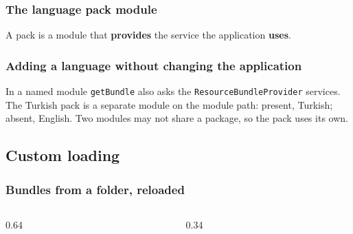 \documentclass[aspectratio=169,10pt,compress]{beamer}
\begin{document}
\begin{frame}[t,fragile] \frametitle{The language pack module}
  \small A pack is a module that \textbf{provides} the service the application \textbf{uses}.
\end{frame}




\begin{frame}[t,fragile] \frametitle{Adding a language without changing the application}

  \vspace{0.1em}
  \small
  In a named module \texttt{getBundle} also asks the \texttt{ResourceBundleProvider} services. The Turkish pack is a separate
  module on the module path: present, Turkish; absent, English. Two modules may not share a package, so the pack uses its own.
\end{frame}

\subsection[Custom loading]{Custom loading}




\begin{frame}[t,fragile] \frametitle{Bundles from a folder, reloaded}
  \begin{columns}[T]
    \begin{column}{0.64\textwidth}
    \end{column}
    \begin{column}{0.34\textwidth}
    \end{column}
  \end{columns}
\end{frame}
\end{document}
